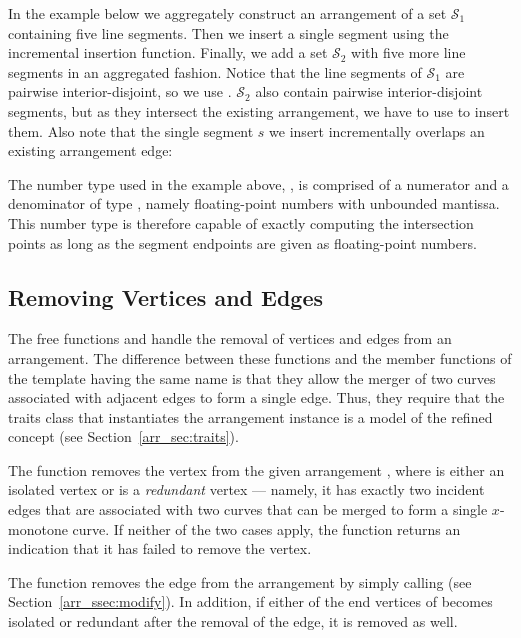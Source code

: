 In the example below we aggregately construct an arrangement of a set
${\mathcal S}_1$ containing five line segments. Then we insert a single
segment using the incremental insertion function. Finally, we add a set
${\mathcal S}_2$ with five more line segments in an aggregated fashion.
Notice that the line segments of ${\mathcal S}_1$ are pairwise
interior-disjoint, so we use .
${\mathcal S}_2$ also contain pairwise interior-disjoint segments,
but as they intersect the existing arrangement, we have to use
 to insert them. Also note that the
single segment $s$ we insert incrementally overlaps an existing
arrangement edge:


The number type used in the example above,
, is comprised of a numerator and a
denominator of type , namely floating-point numbers
with unbounded mantissa. This number type is therefore capable of
exactly computing the intersection points as long as the segment
endpoints are given as floating-point numbers.

\subsection{Removing Vertices and Edges\label{arr_ssec:gl_remove}}

The free functions  and  handle
the removal of vertices and edges from an arrangement. The difference
between these functions and the member functions of the 
template having the same name is that they allow the merger of two curves
associated with adjacent edges to form a single edge. Thus, they require
that the traits class that instantiates the arrangement instance is a model
of the refined  concept (see
Section~\ref{arr_sec:traits}).

The function  removes the vertex
 from the given arrangement , where  is
either an isolated vertex or is a {\em redundant} vertex ---
namely, it has exactly two incident edges that are associated with
two curves that can be merged to form a single $x$-monotone curve.
If neither of the two cases apply, the function returns an
indication that it has failed to remove the vertex.

The function  removes the edge 
from the arrangement by simply calling 
(see Section~\ref{arr_ssec:modify}). In addition, if either of the
end vertices of  becomes isolated or redundant after the removal
of the edge, it is removed as well.

